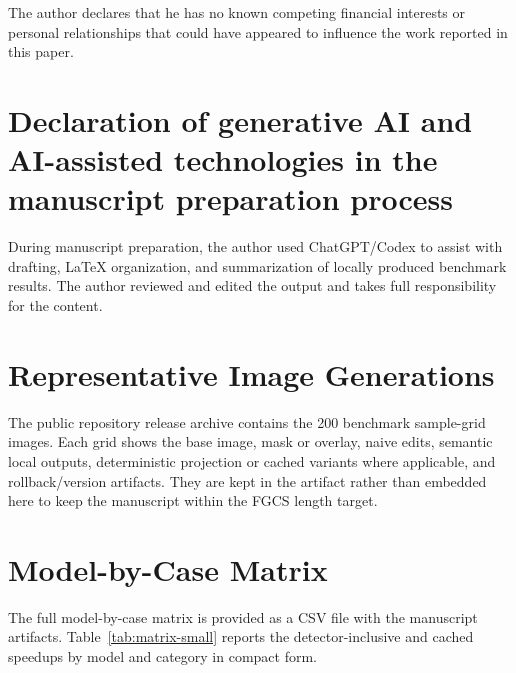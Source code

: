\documentclass[final,5p,times,number,sort&compress]{elsarticle}
\begin{document}
The author declares that he has no known competing financial interests or personal relationships that could have appeared to influence the work reported in this paper.

\section*{Declaration of generative AI and AI-assisted technologies in the manuscript preparation process}

During manuscript preparation, the author used ChatGPT/Codex to assist with drafting, LaTeX organization, and summarization of locally produced benchmark results. The author reviewed and edited the output and takes full responsibility for the content.

\appendix

\section{Representative Image Generations}

The public repository release archive contains the 200 benchmark sample-grid images. Each grid shows the base image, mask or overlay, naive edits, semantic local outputs, deterministic projection or cached variants where applicable, and rollback/version artifacts. They are kept in the artifact rather than embedded here to keep the manuscript within the FGCS length target.

\section{Model-by-Case Matrix}

The full model-by-case matrix is provided as a CSV file with the manuscript artifacts. Table~\ref{tab:matrix-small} reports the detector-inclusive and cached speedups by model and category in compact form.
\end{document}
